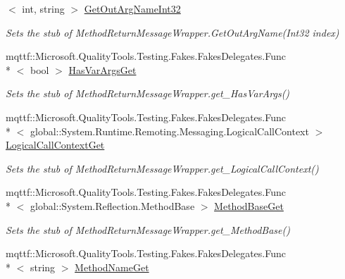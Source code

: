 \begin{DoxyCompactItemize}
$<$ int, string $>$ \hyperlink{class_system_1_1_runtime_1_1_remoting_1_1_messaging_1_1_fakes_1_1_stub_method_return_message_wrapper_a884f9144edf26922058ff5d70acd3af2}{Get\-Out\-Arg\-Name\-Int32}
\begin{DoxyCompactList}\small\item\em Sets the stub of Method\-Return\-Message\-Wrapper.\-Get\-Out\-Arg\-Name(\-Int32 index)\end{DoxyCompactList}\item 
mqttf\-::\-Microsoft.\-Quality\-Tools.\-Testing.\-Fakes.\-Fakes\-Delegates.\-Func\\*
$<$ bool $>$ \hyperlink{class_system_1_1_runtime_1_1_remoting_1_1_messaging_1_1_fakes_1_1_stub_method_return_message_wrapper_ab5edcd48a60e7bd1839a8355874cbbb1}{Has\-Var\-Args\-Get}
\begin{DoxyCompactList}\small\item\em Sets the stub of Method\-Return\-Message\-Wrapper.\-get\-\_\-\-Has\-Var\-Args()\end{DoxyCompactList}\item 
mqttf\-::\-Microsoft.\-Quality\-Tools.\-Testing.\-Fakes.\-Fakes\-Delegates.\-Func\\*
$<$ global\-::\-System.\-Runtime.\-Remoting.\-Messaging.\-Logical\-Call\-Context $>$ \hyperlink{class_system_1_1_runtime_1_1_remoting_1_1_messaging_1_1_fakes_1_1_stub_method_return_message_wrapper_a1368df549ec4c46ade358a0e137a317d}{Logical\-Call\-Context\-Get}
\begin{DoxyCompactList}\small\item\em Sets the stub of Method\-Return\-Message\-Wrapper.\-get\-\_\-\-Logical\-Call\-Context()\end{DoxyCompactList}\item 
mqttf\-::\-Microsoft.\-Quality\-Tools.\-Testing.\-Fakes.\-Fakes\-Delegates.\-Func\\*
$<$ global\-::\-System.\-Reflection.\-Method\-Base $>$ \hyperlink{class_system_1_1_runtime_1_1_remoting_1_1_messaging_1_1_fakes_1_1_stub_method_return_message_wrapper_a57d20021d191c20e62f02468a2306b1b}{Method\-Base\-Get}
\begin{DoxyCompactList}\small\item\em Sets the stub of Method\-Return\-Message\-Wrapper.\-get\-\_\-\-Method\-Base()\end{DoxyCompactList}\item 
mqttf\-::\-Microsoft.\-Quality\-Tools.\-Testing.\-Fakes.\-Fakes\-Delegates.\-Func\\*
$<$ string $>$ \hyperlink{class_system_1_1_runtime_1_1_remoting_1_1_messaging_1_1_fakes_1_1_stub_method_return_message_wrapper_a99ecb17876602171236a1100f9329a80}{Method\-Name\-Get}

\end{DoxyCompactItemize}
